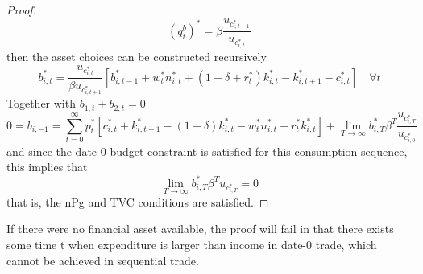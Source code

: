 \documentclass{article}
\begin{document}
\begin{enumerate}
\begin{enumerate}
\begin{enumerate}
\begin{proof}
                    \[(q_{t}^b)^\ast=\beta\frac{u_{c_{i,t+1}^\ast}}{u_{c_{i,t}^\ast}}\]
                    then the asset choices can be constructed recursively
                    \[b_{i,t}^\ast=\frac{u_{c_{i,t}^\ast}}{\beta u_{c_{i,t+1}^\ast}}[b_{i,t-1}^\ast+w_{t}^\ast n_{i,t}^\ast+(1-\delta+r_{t}^\ast)k_{i,t}^\ast-k_{i,t+1}^\ast-c_{i,t}^\ast]\quad\forall t\]
                    Together with \(b_{1,t}+b_{2,t}=0\)
                    \[0=b_{i,-1}=\sum_{t=0}^\infty p_t^\ast[c_{i,t}^\ast+k_{i,t+1}^\ast-(1-\delta)k_{i,t}^\ast-w_{t}^\ast n_{i,t}^\ast-r_{t}^\ast k_{i,t}^\ast]+\lim_{T\to\infty}b_{i,T}^\ast\beta^T\frac{u_{c_{i,T}^\ast}}{u_{c_{i,0}^\ast}}\]
                    and since the date-0 budget constraint is satisfied for this consumption sequence, this implies that
                    \[\lim_{T\to\infty}b_{i,T}^\ast\beta^Tu_{c_{i,T}^\ast}=0\]
                    that is, the nPg and TVC conditions are satisfied.
                \end{proof}
                If there were no financial asset available, the proof will fail in that there exists some time t when expenditure is larger than income in date-0 trade, which cannot be achieved in sequential trade.
            \end{enumerate}
        \end{enumerate}
    \end{enumerate}
\end{document}
